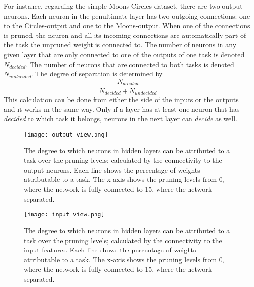 For instance, regarding the simple Moons-Circles dataset, there are two output neurons.
Each neuron in the penultimate layer has two outgoing connections: one to the Circles-output and one to the Moons-output.
When one of the connections is pruned, the neuron and all its incoming connections are automatically part of the task the unpruned weight is connected to.
The number of neurons in any given layer that are only connected to one of the outputs of one task is denoted $N_{decided}$.
The number of neurons that are connected to both tasks is denoted $N_{undecided}$.
The degree of separation is determined by 
\[ \frac{N_{decided}}{N_{decided}+N_{undecided}} \]
This calculation can be done from either the side of the inputs or the outputs and it works in the same way.
Only if a layer has at least one neuron that has \textit{decided} to which task it belongs, neurons in the next layer can \textit{decide} as well.

\begin{figure}[t] %
    \centering
    \texttt{[image: output-view.png]}
    \caption[Separation from the view of output neurons]{
    The degree to which neurons in hidden layers can be attributed to a task over the pruning levels; calculated by the connectivity to the output neurons.
    Each line shows the percentage of weights attributable to a task.
    The x-axis shows the pruning levels from 0, where the network is fully connected to 15, where the network separated.
    }\label{fig:outview}
\end{figure}

\begin{figure}[t] %
    \centering
    \texttt{[image: input-view.png]}
    \caption[Separation from the view of input neurons]{
        The degree to which neurons in hidden layers can be attributed to a task over the pruning levels; calculated by the connectivity to the input features.
        Each line shows the percentage of weights attributable to a task.
        The x-axis shows the pruning levels from 0, where the network is fully connected to 15, where the network separated.
    }\label{fig:inview}
\end{figure}

